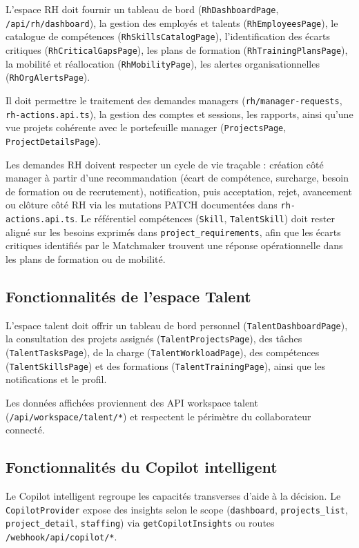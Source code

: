 L'espace RH doit fournir un tableau de bord (\texttt{RhDashboardPage}, \texttt{/api/rh/dashboard}), la gestion des employés et talents (\texttt{RhEmployeesPage}), le catalogue de compétences (\texttt{RhSkillsCatalogPage}), l'identification des écarts critiques (\texttt{RhCriticalGapsPage}), les plans de formation (\texttt{RhTrainingPlansPage}), la mobilité et réallocation (\texttt{RhMobilityPage}), les alertes organisationnelles (\texttt{RhOrgAlertsPage}).

Il doit permettre le traitement des demandes managers (\texttt{rh/manager-requests}, \texttt{rh-actions.api.ts}), la gestion des comptes et sessions, les rapports, ainsi qu'une vue projets cohérente avec le portefeuille manager (\texttt{ProjectsPage}, \texttt{ProjectDetailsPage}).

Les demandes RH doivent respecter un cycle de vie traçable : création côté manager à partir d'une recommandation (écart de compétence, surcharge, besoin de formation ou de recrutement), notification, puis acceptation, rejet, avancement ou clôture côté RH via les mutations PATCH documentées dans \texttt{rh-actions.api.ts}. Le référentiel compétences (\texttt{Skill}, \texttt{TalentSkill}) doit rester aligné sur les besoins exprimés dans \texttt{project\_requirements}, afin que les écarts critiques identifiés par le Matchmaker trouvent une réponse opérationnelle dans les plans de formation ou de mobilité.

\subsection{Fonctionnalités de l'espace Talent}

L'espace talent doit offrir un tableau de bord personnel (\texttt{TalentDashboardPage}), la consultation des projets assignés (\texttt{TalentProjectsPage}), des tâches (\texttt{TalentTasksPage}), de la charge (\texttt{TalentWorkloadPage}), des compétences (\texttt{TalentSkillsPage}) et des formations (\texttt{TalentTrainingPage}), ainsi que les notifications et le profil.

Les données affichées proviennent des API workspace talent (\texttt{/api/workspace/talent/*}) et respectent le périmètre du collaborateur connecté.

\subsection{Fonctionnalités du Copilot intelligent}

Le Copilot intelligent regroupe les capacités transverses d'aide à la décision. Le \texttt{CopilotProvider} expose des insights selon le scope (\texttt{dashboard}, \texttt{projects\_list}, \texttt{project\_detail}, \texttt{staffing}) via \texttt{getCopilotInsights} ou routes \texttt{/webhook/api/copilot/*}.

